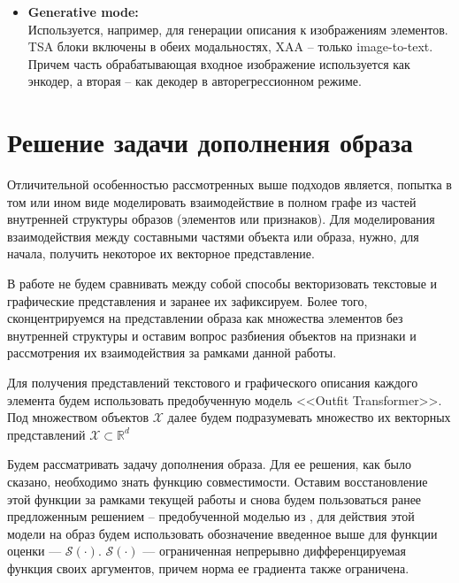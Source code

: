 \documentclass[a4paper,14pt]{extarticle}
\begin{document}
\begin{itemize}
					\item[]\textbf{Generative mode:}\\
					Используется, например, для генерации описания к изображениям элементов. TSA блоки включены в обеих модальностях, XAA -- только image-to-text. Причем часть обрабатывающая входное изображение используется как энкодер, а вторая -- как декодер в авторегрессионном режиме.
				\end{itemize}
			
		\section{Решение задачи дополнения образа}
				Отличительной особенностью рассмотренных выше подходов является, попытка в том или ином виде моделировать взаимодействие в полном графе из частей внутренней структуры образов (элементов или признаков). Для моделирования взаимодействия между составными частями объекта или образа, нужно, для начала, получить некоторое их векторное представление. 
				
				В работе не будем сравнивать между собой способы векторизовать текстовые и графические представления и заранее их зафиксируем. Более того, сконцентрируемся на представлении образа как множества элементов без внутренней структуры и оставим вопрос разбиения объектов на признаки и рассмотрения их взаимодействия за рамками данной работы.
								
				Для получения представлений текстового и графического описания каждого элемента будем использовать предобученную модель <<Outfit Transformer>>\cite{https://doi.org/10.48550/arXiv.2204.04812}. Под множеством объектов $\mathcal{X}$ далее будем подразумевать множество их векторных представлений $\mathcal{X}\subset \mathbb{R}^d$
				
				Будем рассматривать задачу дополнения образа. Для ее решения, как было сказано, необходимо знать функцию совместимости. Оставим восстановление этой функции за рамками текущей работы и снова будем пользоваться ранее предложенным решением -- предобученной моделью из \cite{https://doi.org/10.48550/arXiv.2204.04812}, для действия этой модели на образ будем использовать обозначение введенное выше для функции оценки --- $\mathcal{S}(\cdot)$. 
				$\mathcal{S}(\cdot)$ --- ограниченная непрерывно дифференцируемая функция своих аргументов, причем норма ее градиента также ограничена. 
				
\end{document}
